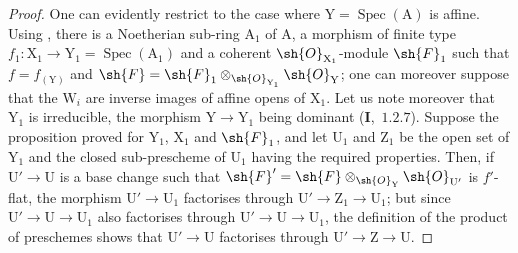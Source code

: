 \begin{proof}
One can evidently restrict to the case where $\mathrm{Y}=\operatorname{Spec}(\mathrm{A})$ is affine. Using
, there is a Noetherian sub-ring $\mathrm{A}_1$ of $\mathrm{A}$, a morphism of finite type
$f_1:\mathrm{X}_1\to\mathrm{Y}_1=\operatorname{Spec}(\mathrm{A}_1)$ and a coherent $\sh{O}_{\mathrm{X}_1}$-module $\sh{F}_1$ such that $f=f_{(\mathrm{Y})}$ and $\sh{F}=\sh{F}_1\otimes_{\sh{O}_{\mathrm{Y}_1}}\sh{O}_\mathrm{Y}$;
one can moreover suppose that the $\mathrm{W}_i$ are inverse images of affine opens of $\mathrm{X}_1$.
Let us note moreover that $\mathrm{Y}_1$ is irreducible, the morphism $\mathrm{Y}\to\mathrm{Y}_1$ being dominant (\textbf{I},~$1.2.7$).
Suppose the proposition proved for $\mathrm{Y}_1$, $\mathrm{X}_1$ and $\sh{F}_1$, and let $\mathrm{U}_1$ and $\mathrm{Z}_1$ be the open set of $\mathrm{Y}_1$
and the closed sub-prescheme of $\mathrm{U}_1$ having the required properties. Then, if $\mathrm{U}'\to\mathrm{U}$ is a base change
such that $\sh{F}'=\sh{F}\otimes_{\sh{O}_\mathrm{Y}}\sh{O}_{\mathrm{U}'}$ is $f'$-flat, the morphism $\mathrm{U}'\to\mathrm{U}_1$ factorises
through $\mathrm{U}'\to\mathrm{Z}_1\to\mathrm{U}_1$; but since $\mathrm{U}'\to\mathrm{U}\to\mathrm{U}_1$ also factorises through $\mathrm{U}'\to\mathrm{U}\to\mathrm{U}_1$, the definition
of the product of preschemes shows that $\mathrm{U}'\to\mathrm{U}$ factorises through $\mathrm{U}'\to\mathrm{Z}\to\mathrm{U}$.


\end{proof}
